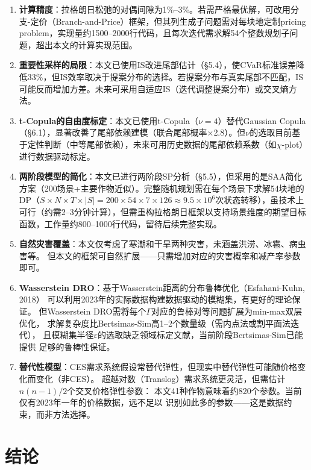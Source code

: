 \documentclass[12pt]{ctexart}
\begin{document}
\begin{enumerate}[label=(\arabic*), leftmargin=*]
    \item \textbf{计算精度}：拉格朗日松弛的对偶间隙为1\%--3\%。若需严格最优解，可改用分支-定价（Branch-and-Price）框架，但其列生成子问题需对每块地定制pricing problem，实现量约1500--2000行代码，且每次迭代需求解54个整数规划子问题，超出本文的计算实现范围。
    \item \textbf{重要性采样的局限}：本文已使用IS改进尾部估计（§5.4），使CVaR标准误差降低33\%，但IS效率取决于提案分布的选择。若提案分布与真实尾部不匹配，IS可能反而增加方差。未来可采用自适应IS（迭代调整提案分布）或交叉熵方法。
    \item \textbf{t-Copula的自由度标定}：本文已使用t-Copula（$\nu=4$）替代Gaussian Copula（§6.1），显著改善了尾部依赖建模（联合尾部概率$\times$2.8）。但$\nu$的选取目前基于定性判断（中等尾部依赖），未来可用历史数据的尾部依赖系数（如$\chi$-plot）进行数据驱动标定。
    \item \textbf{两阶段模型的简化}：本文已进行两阶段SP分析（§5.5），但采用的是SAA简化方案（200场景+主要作物近似）。完整随机规划需在每个场景下求解54块地的DP（$S\times N\times T\times|S| = 200\times54\times7\times126 \approx 9.5\times10^6$次状态转移），虽技术上可行（约需2--3分钟计算），但需重构拉格朗日框架以支持场景维度的期望目标函数，工作量约800--1000行代码，留待后续完整实现。
    \item \textbf{自然灾害覆盖}：本文仅考虑了寒潮和干旱两种灾害，未涵盖洪涝、冰雹、病虫害等。
          但本文的框架可自然扩展——只需增加对应的灾害概率和减产率参数即可。
    \item \textbf{Wasserstein DRO}：基于Wasserstein距离的分布鲁棒优化（Esfahani-Kuhn, 2018）
          可以利用2023年的实际数据构建数据驱动的模糊集，有更好的理论保证。
          但Wasserstein DRO需将每个$\Gamma$对应的鲁棒对等问题扩展为min-max双层优化，
          求解复杂度比Bertsimas-Sim高1--2个数量级（需内点法或割平面法迭代），
          且模糊集半径$\varepsilon$的选取缺乏领域标定文献，当前阶段Bertsimas-Sim已能提供
          足够的鲁棒性保证。
    \item \textbf{替代性模型}：CES需求系统假设常替代弹性，但现实中替代弹性可能随价格变化而变化（非CES）。
          超越对数（Translog）需求系统更灵活，但需估计$n(n-1)/2$个交叉价格弹性参数：
          本文41种作物意味着约820个参数。当前仅有2023年一年的价格数据，远不足以
          识别如此多的参数——这是数据约束，而非方法选择。
\end{enumerate}

\section{结论}
\end{document}
